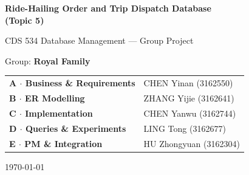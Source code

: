 \documentclass[12pt,a4paper]{article}
\begin{document}
\begin{titlepage}
  \centering
  \vspace*{2cm}
  {\LARGE\bfseries Ride-Hailing Order and Trip Dispatch Database\\[0.3em]
   \large (Topic 5)}\par
  \vspace{1.5cm}
  {\large CDS 534 Database Management --- Group Project}\par
  \vspace{2.5cm}
  {\large Group: \textbf{Royal Family}}\par
  \vspace{1cm}
  \begin{tabular}{ll}
    \textbf{A $\cdot$ Business \& Requirements} & CHEN Yinan (3162550) \\
    \textbf{B $\cdot$ ER Modelling}             & ZHANG Yijie (3162641) \\
    \textbf{C $\cdot$ Implementation}           & CHEN Yanwu (3162744) \\
    \textbf{D $\cdot$ Queries \& Experiments}   & LING Tong (3162677) \\
    \textbf{E $\cdot$ PM \& Integration}        & HU Zhongyuan (3162304) \\
  \end{tabular}\par
  \vfill
  {\large \today}\par
\end{titlepage}

\tableofcontents
\newpage



{\footnotesize}

\appendix
\end{document}
